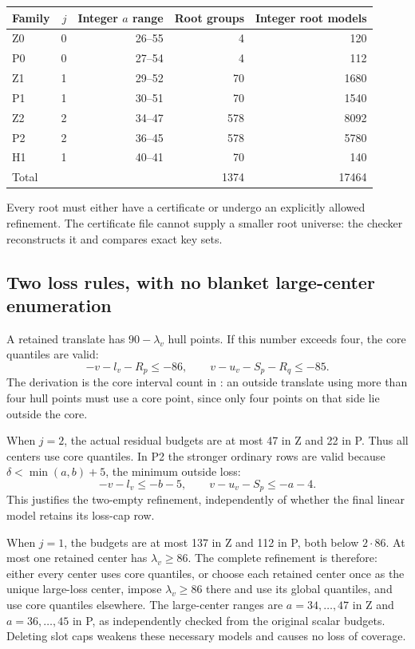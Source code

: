 \documentclass[11pt,a4paper]{article}
\begin{document}
\begin{center}\small
\begin{tabular}{lrrrr}
\toprule
Family&$j$&Integer $a$ range&Root groups&Integer root models\\
\midrule
Z0&0&26--55&4&120\\
P0&0&27--54&4&112\\
Z1&1&29--52&70&1680\\
P1&1&30--51&70&1540\\
Z2&2&34--47&578&8092\\
P2&2&36--45&578&5780\\
H1&1&40--41&70&140\\
\midrule
Total&&&1374&17464\\
\bottomrule
\end{tabular}
\end{center}
Every root must either have a certificate or undergo an explicitly
allowed refinement. The certificate file cannot supply a smaller root
universe: the checker reconstructs it and compares exact key sets.

\subsection{Two loss rules, with no blanket large-center enumeration}
A retained translate has $90-\lambda_v$ hull points. If this number
exceeds four, the core quantiles are valid:
\[
 -v-l_v-R_p\le-86,\qquad v-u_v-S_p-R_q\le-85.
\]
The derivation is the core interval count in \cite{previous}: an
outside translate using more than four hull points must use a core
point, since only four points on that side lie outside the core.

When $j=2$, the actual residual budgets are at most 47 in Z and 22 in P.
Thus all centers use core quantiles. In P2 the stronger ordinary rows
are valid because $\delta<\min(a,b)+5$, the minimum outside loss:
\[
 -v-l_v\le-b-5,\qquad v-u_v-S_p\le-a-4.
\]
This justifies the two-empty refinement, independently of whether the
final linear model retains its loss-cap row.

When $j=1$, the budgets are at most 137 in Z and 112 in P, both below
$2\cdot86$. At most one retained center has $\lambda_v\ge86$.
The complete refinement is therefore: either every center uses core
quantiles, or choose each retained center once as the unique large-loss
center, impose $\lambda_v\ge86$ there and use its global quantiles,
and use core quantiles elsewhere. The large-center ranges are
$a=34,\ldots,47$ in Z and $a=36,\ldots,45$ in P, as independently
checked from the original scalar budgets. Deleting slot caps weakens
these necessary models and causes no loss of coverage.
\end{document}
